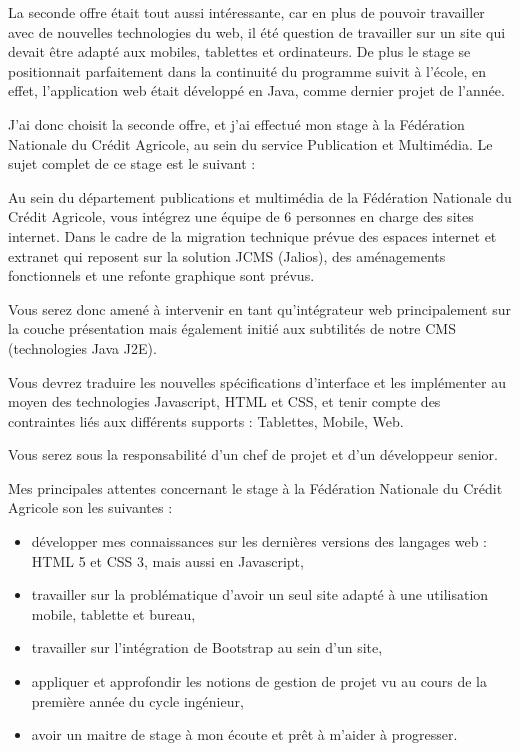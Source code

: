 \documentclass[12pt,a4paper]{article}
\begin{document}
\medskip
La seconde offre était tout aussi intéressante, car en plus de pouvoir travailler avec de nouvelles technologies du web, il été question de travailler sur un site qui devait être adapté aux mobiles, tablettes et ordinateurs. De plus le stage se positionnait parfaitement dans la continuité du programme suivit à l'école, en effet, l'application web était développé en Java, comme dernier projet de l'année.\par 
\medskip
J'ai donc choisit la seconde offre, et j'ai effectué mon stage à la Fédération Nationale du Crédit Agricole, au sein du service Publication et Multimédia. Le sujet complet de ce stage est le suivant :\par 
\medskip
Au sein du département publications et multimédia de la Fédération Nationale du Crédit Agricole, vous intégrez une équipe de 6 personnes en charge des sites internet. Dans le cadre de la migration technique prévue des espaces internet et extranet qui reposent sur la solution JCMS (Jalios), des aménagements fonctionnels et une refonte graphique sont prévus.\par
Vous serez donc amené à intervenir en tant qu'intégrateur web principalement sur la couche présentation mais également initié aux subtilités de notre CMS (technologies Java J2E).\par
Vous devrez traduire les nouvelles spécifications d'interface et les implémenter au moyen des technologies Javascript, HTML et CSS, et tenir compte des contraintes liés aux différents supports : Tablettes, Mobile, Web.\par 
Vous serez sous la responsabilité d'un chef de projet et d'un développeur senior.\par 
\medskip
Mes principales attentes concernant le stage à la Fédération Nationale du Crédit Agricole son les suivantes :
\begin{itemize}
\item développer mes connaissances sur les dernières versions des langages web : HTML 5 et  CSS 3, mais aussi en Javascript,
\item travailler sur la problématique d'avoir un seul site adapté à une utilisation mobile, tablette et bureau,
\item travailler sur l'intégration de Bootstrap au sein d'un site,
\item appliquer et approfondir les notions de gestion de projet vu au cours de la première année du cycle ingénieur,
\item avoir un maitre de stage à mon écoute et prêt à m'aider à progresser.
\end{itemize}
\end{document}

